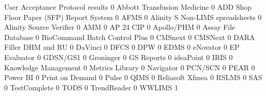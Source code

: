 \documentclass{article}
\begin{document}
\begin{Schunk}
\begin{Soutput}
                                           User Acceptance Protocol results
                                                                          0
  Abbott Transfusion Medicine                                             0
  ADD Shop Floor Paper (SFP) Report System                                0
  AFMS                                                                    0
  Alinity S Non-LIMS spreadsheets                                         0
  Alinity Source Verifier                                                 0
  AMM                                                                     0
  AP 24 CIP                                                               0
  Apollo/PHM                                                              0
  Assay File Database                                                     0
  BioCommand Batch Control Plus                                           0
  CMSnext                                                                 0
  CMSNext                                                                 0
  DARA Filler DHM and RU                                                  0
  DaVinci                                                                 0
  DFCS                                                                    0
  DPW                                                                     0
  EDMS                                                                    0
  eNovator                                                                0
  EP Evaluator                                                            0
  GDSN/GS1                                                                0
  Groninger                                                               0
  GS Reports                                                              0
  ideaPoint                                                               0
  IRIS                                                                    0
  Knowledge Management                                                    0
  Metrics Library                                                         0
  Navigator                                                               0
  PCN/SCN                                                                 0
  PEAR                                                                    0
  Power BI                                                                0
  Print on Demand                                                         0
  Pulse                                                                   0
  QIMS                                                                    0
  Reliasoft Xfmea                                                         0
  RSLMS                                                                   0
  SAS                                                                     0
  TestComplete                                                            0
  TODS                                                                    0
  TrendReader                                                             0
  WWLIMS                                                                  1
                                          

\end{Soutput}
\end{Schunk}
\end{document}
